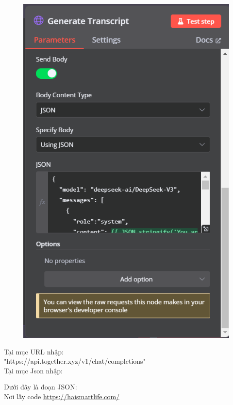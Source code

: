 \begin{itemize}[label=]
\begin{figure}[H]
    \hspace{5pt}
    \begin{minipage}{0.45\textwidth}
         \includegraphics[width=\linewidth]{images/TogetherAI-3.png}
    \end{minipage}
\end{figure}

Tại mục URL nhập: \\
"https://api.together.xyz/v1/chat/completions"\\

Tại mục Json nhập: 


Dưới đây là đoạn JSON:\\

Nơi lấy code \url{https://haismartlife.com/}


\end{itemize}

